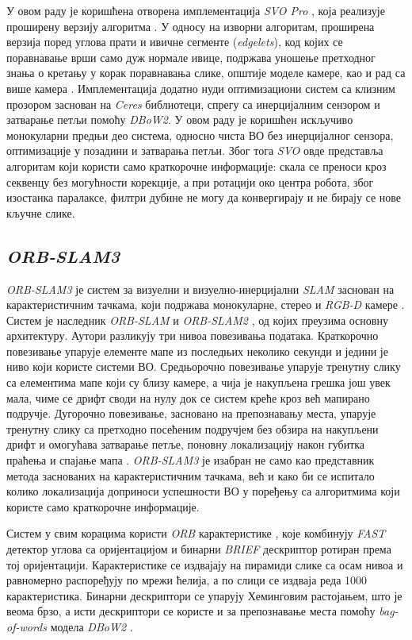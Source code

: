 \documentclass[12pt]{article}
\begin{document}
У овом раду је коришћена отворена имплементација \textit{SVO Pro}
\cite{svo_pro_open}, која реализује проширену верзију алгоритма
\cite{forster2017svo}. У односу на изворни алгоритам, проширена верзија поред
углова прати и ивичне сегменте (\textit{edgelets}), код којих се поравнавање
врши само дуж нормале ивице, подржава уношење претходног знања о кретању у
корак поравнавања слике, општије моделе камере, као и рад са више камера
\cite{forster2017svo}. Имплементација додатно нуди оптимизациони систем са
клизним прозором заснован на \textit{Ceres} библиотеци, спрегу са инерцијалним
сензором и затварање петљи помоћу \textit{DBoW2}. У овом раду је коришћен
искључиво монокуларни предњи део система, односно чиста ВО без инерцијалног
сензора, оптимизације у позадини и затварања петљи. Због тога \textit{SVO} овде
представља алгоритам који користи само краткорочне информације: скала се
преноси кроз секвенцу без могућности корекције, а при ротацији око центра
робота, због изостанка паралаксе, филтри дубине не могу да конвергирају и не
бирају се нове кључне слике.

\subsection{\textit{ORB-SLAM3}}
\textit{ORB-SLAM3} је систем за визуелни и визуелно-инерцијални \textit{SLAM}
заснован на карактеристичним тачкама, који подржава монокуларне, стерео и
\textit{RGB-D} камере \cite{campos2021orbslam3}. Систем је наследник
\textit{ORB-SLAM} \cite{murartal2015orbslam} и \textit{ORB-SLAM2}
\cite{murartal2017orbslam2}, од којих преузима основну архитектуру. Аутори
разликују три нивоа повезивања података. Краткорочно повезивање упарује
елементе мапе из последњих неколико секунди и једини је ниво који користе
системи ВО. Средњорочно повезивање упарује тренутну слику са елементима мапе
који су близу камере, а чија је накупљена грешка још увек мала, чиме се дрифт
своди на нулу док се систем креће кроз већ мапирано подручје. Дугорочно
повезивање, засновано на препознавању места, упарује тренутну слику са
претходно посећеним подручјем без обзира на накупљени дрифт и омогућава
затварање петље, поновну локализацију након губитка праћења и спајање мапа
\cite{campos2021orbslam3}. \textit{ORB-SLAM3} је изабран не само као
представник метода заснованих на карактеристичним тачкама, већ и како би се
испитало колико локализација доприноси успешности ВО у поређењу са алгоритмима
који користе само краткорочне информације.

Систем у свим корацима користи \textit{ORB} карактеристике
\cite{rublee2011orb}, које комбинују \textit{FAST} детектор углова са
оријентацијом и бинарни \textit{BRIEF} дескриптор ротиран према тој
оријентацији. Карактеристике се издвајају на пирамиди слике са осам нивоа и
равномерно распоређују по мрежи ћелија, а по слици се издваја реда 1000
карактеристика. Бинарни дескриптори се упарују Хеминговим растојањем, што је
веома брзо, а исти дескриптори се користе и за препознавање места помоћу
\textit{bag-of-words} модела \textit{DBoW2} \cite{galvez2012dbow2}.
\end{document}
